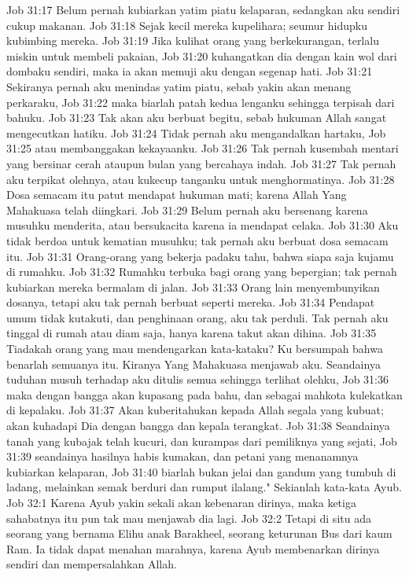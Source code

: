 Job 31:17  Belum pernah kubiarkan yatim piatu kelaparan, sedangkan aku sendiri cukup makanan.
Job 31:18  Sejak kecil mereka kupelihara; seumur hidupku kubimbing mereka.
Job 31:19  Jika kulihat orang yang berkekurangan, terlalu miskin untuk membeli pakaian,
Job 31:20  kuhangatkan dia dengan kain wol dari dombaku sendiri, maka ia akan memuji aku dengan segenap hati.
Job 31:21  Sekiranya pernah aku menindas yatim piatu, sebab yakin akan menang perkaraku,
Job 31:22  maka biarlah patah kedua lenganku sehingga terpisah dari bahuku.
Job 31:23  Tak akan aku berbuat begitu, sebab hukuman Allah sangat mengecutkan hatiku.
Job 31:24  Tidak pernah aku mengandalkan hartaku,
Job 31:25  atau membanggakan kekayaanku.
Job 31:26  Tak pernah kusembah mentari yang bersinar cerah ataupun bulan yang bercahaya indah.
Job 31:27  Tak pernah aku terpikat olehnya, atau kukecup tanganku untuk menghormatinya.
Job 31:28  Dosa semacam itu patut mendapat hukuman mati; karena Allah Yang Mahakuasa telah diingkari.
Job 31:29  Belum pernah aku bersenang karena musuhku menderita, atau bersukacita karena ia mendapat celaka.
Job 31:30  Aku tidak berdoa untuk kematian musuhku; tak pernah aku berbuat dosa semacam itu.
Job 31:31  Orang-orang yang bekerja padaku tahu, bahwa siapa saja kujamu di rumahku.
Job 31:32  Rumahku terbuka bagi orang yang bepergian; tak pernah kubiarkan mereka bermalam di jalan.
Job 31:33  Orang lain menyembunyikan dosanya, tetapi aku tak pernah berbuat seperti mereka.
Job 31:34  Pendapat umum tidak kutakuti, dan penghinaan orang, aku tak perduli. Tak pernah aku tinggal di rumah atau diam saja, hanya karena takut akan dihina.
Job 31:35  Tiadakah orang yang mau mendengarkan kata-kataku? Ku bersumpah bahwa benarlah semuanya itu. Kiranya Yang Mahakuasa menjawab aku. Seandainya tuduhan musuh terhadap aku ditulis semua sehingga terlihat olehku,
Job 31:36  maka dengan bangga akan kupasang pada bahu, dan sebagai mahkota kulekatkan di kepalaku.
Job 31:37  Akan kuberitahukan kepada Allah segala yang kubuat; akan kuhadapi Dia dengan bangga dan kepala terangkat.
Job 31:38  Seandainya tanah yang kubajak telah kucuri, dan kurampas dari pemiliknya yang sejati,
Job 31:39  seandainya hasilnya habis kumakan, dan petani yang menanamnya kubiarkan kelaparan,
Job 31:40  biarlah bukan jelai dan gandum yang tumbuh di ladang, melainkan semak berduri dan rumput ilalang." Sekianlah kata-kata Ayub.
Job 32:1  Karena Ayub yakin sekali akan kebenaran dirinya, maka ketiga sahabatnya itu pun tak mau menjawab dia lagi.
Job 32:2  Tetapi di situ ada seorang yang bernama Elihu anak Barakheel, seorang keturunan Bus dari kaum Ram. Ia tidak dapat menahan marahnya, karena Ayub membenarkan dirinya sendiri dan mempersalahkan Allah.
